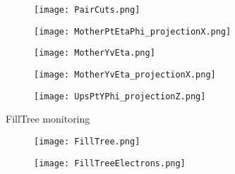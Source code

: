 \documentclass{beamer}
\begin{document}
\begin{frame}
  \begin{figure}[h!]
  \centering
  \texttt{[image: PairCuts.png]}
  \end{figure}
\end{frame}

\begin{frame}
  \begin{figure}[h!]
  \centering
  \texttt{[image: MotherPtEtaPhi\_projectionX.png]}
  \end{figure}
\end{frame}

\begin{frame}
  \begin{figure}[h!]
  \centering
  \texttt{[image: MotherYvEta.png]}
  \end{figure}
\end{frame}

\begin{frame}
  \begin{figure}[h!]
  \centering
  \texttt{[image: MotherYvEta\_projectionX.png]}
  \end{figure}
\end{frame}

\begin{frame}
  \begin{figure}[h!]
  \centering
  \texttt{[image: UpsPtYPhi\_projectionZ.png]}
  \end{figure}
\end{frame}

\begin{frame}
  \begin{center}
 	\Huge FillTree monitoring
 	\end{center}
\end{frame}

\begin{frame}
  \begin{figure}[h!]
  \centering
  \texttt{[image: FillTree.png]}
  \end{figure}
\end{frame}

\begin{frame}
  \begin{figure}[h!]
  \centering
  \texttt{[image: FillTreeElectrons.png]}
  \end{figure}
\end{frame}

\end{document}
